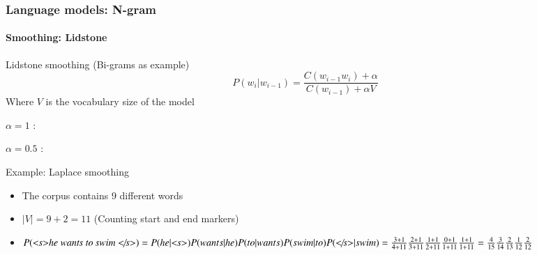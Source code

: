 \documentclass[xcolor=table]{beamer}
\begin{document}
\begin{frame}
\frametitle{Language models: N-gram}
\framesubtitle{Smoothing: Lidstone}

\vspace{-6pt}
\begin{block}{Lidstone smoothing (Bi-grams as example)}
	\[%
	P(w_i | w_{i-1}) = \frac{C(w_{i-1} w_i) + \alpha}{C(w_{i-1}) + \alpha V}
	\]
	Where $V$ is the vocabulary size of the model
	
	$\alpha = 1$ :  
	
	$\alpha = 0.5$ : 
\end{block}

\vspace{-8pt}
\begin{exampleblock}{Example: Laplace smoothing}
	\begin{itemize}
		\item The corpus contains 9 different words
		\item $|V| = 9 + 2 = 11$ (Counting start and end markers)
		\item $P(\text{\textit{\textless s\textgreater he wants to swim \textless/s\textgreater}}) = 
		P(he|\text{\textit{\textless s\textgreater}}) P(wants|he) P(to|wants) P(swim|to) P(\text{\textit{\textless/s\textgreater}}|swim) = 
		\frac{3 + 1}{4 + 11} \frac{2 + 1}{3 + 11} \frac{1 + 1}{2 + 11} \frac{0 + 1}{1 + 11} \frac{1 + 1}{1 + 11}
		= \frac{4}{15} \frac{3}{14} \frac{2}{13} \frac{1}{12} \frac{2}{12} $
	\end{itemize}
\end{exampleblock}

\end{frame}
\end{document}
